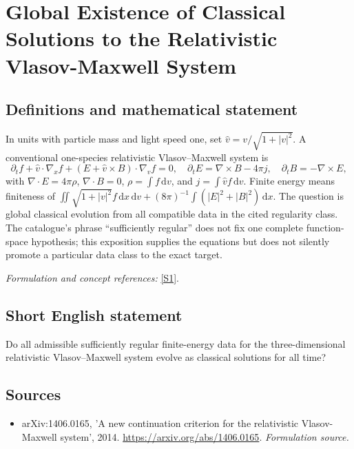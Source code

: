 \documentclass[11pt]{article}
\begin{document}
\section*{\texorpdfstring{Global Existence of Classical Solutions to the Relativistic Vlasov-Maxwell System}{Global Existence of Classical Solutions to the Relativistic Vlasov-Maxwell System}}\label{214}
\subsection{Definitions and mathematical statement}
In units with particle mass and light speed one, set $\widehat v=v/\sqrt{1+|v|^2}$. A conventional one-species relativistic Vlasov--Maxwell system is
\[
 \partial_tf+\widehat v\cdot\nabla_xf+(E+\widehat v\times B)\cdot\nabla_vf=0,
 \quad \partial_tE=\nabla\times B-4\pi j,\quad\partial_tB=-\nabla\times E,
\]
with $\nabla\cdot E=4\pi\rho$, $\nabla\cdot B=0$, $\rho=\int f{\,\mathrm{d}} v$, and $j=\int\widehat v f{\,\mathrm{d}} v$. Finite energy means finiteness of
$\iint\sqrt{1+|v|^2}f{\,\mathrm{d}} x{\,\mathrm{d}} v+(8\pi)^{-1}\int(|E|^2+|B|^2){\,\mathrm{d}} x$.
The question is global classical evolution from all compatible data in the cited regularity class. The catalogue's phrase ``sufficiently regular'' does not fix one complete function-space hypothesis; this exposition supplies the equations but does not silently promote a particular data class to the exact target.
\par\smallskip\textit{Formulation and concept references:} \href{https://arxiv.org/abs/1406.0165}{[S1]}.

\subsection{Short English statement}
Do all admissible sufficiently regular finite-energy data for the three-dimensional relativistic Vlasov–Maxwell system evolve as classical solutions for all time?
\subsection{Sources}
\begin{itemize}
\item[S1]arXiv:1406.0165, 'A new continuation criterion for the relativistic Vlasov-Maxwell system', 2014.
\url{https://arxiv.org/abs/1406.0165}.
\textit{Formulation source.}
\end{itemize}
\end{document}

